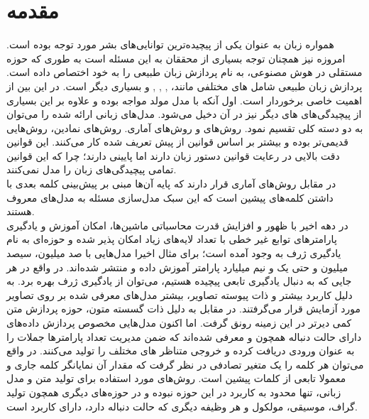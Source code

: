 \chapter{مقدمه}\label{Chap:Chap1}
\minitoc
همواره زبان به عنوان یکی از پیچیده‌ترین توانایی‌های بشر مورد توجه بوده است. امروزه نیز همچنان توجه بسیاری از محققان به این مسئله است به طوری که حوزه مستقلی در هوش مصنوعی، به نام پردازش زبان طبیعی را به خود اختصاص داده است. پردازش زبان طبیعی شامل 
های
مختلفی مانند، 
,
,
,
و بسیاری دیگر است. در این بین \task{}
از اهمیت خاصی برخوردار است. اول آنکه با مدل مولد مواجه بوده و علاوه بر این بسیاری از پیچیدگی‌های \task{}های دیگر نیز در آن دخیل می‌شود.
مدل‌های زبانی ارائه شده را می‌توان به دو دسته کلی تقسیم نمود. روش‌های
  و روش‌های آماری. روش‌های نمادین، روش‌هایی قدیمی‌تر بوده و بیشتر بر اساس قوانین از پیش تعریف شده کار می‌کنند. این قوانین دقت بالایی در رعایت قوانین دستور زبان دارند اما
   پایینی دارند؛ چرا که این قوانین تمامی پیچیدگی‌های زبان را مدل نمی‌کنند.\\
در مقابل روش‌های آماری قرار دارند که پایه آن‌ها مبنی بر پیش‌بینی کلمه بعدی با داشتن کلمه‌های پیشین است که این سبک مدل‌سازی مسئله به مدل‌های  معروف هستند. \\
در دهه اخیر با ظهور 
و افزایش قدرت محاسباتی ماشین‌ها، امکان آموزش و یادگیری پارامترهای توابع غیر خطی با تعداد لایه‌های زیاد امکان پذیر شده و حوزه‌ای به نام یادگیری ژرف به وجود آمده است؛ برای مثال اخیرا مدل‌هایی با صد میلیون، سیصد میلیون و حتی یک و نیم میلیارد پارامتر آموزش داده و منتشر شده‌اند. در واقع در هر جایی که به دنبال یادگیری تابعی پیچیده هستیم، می‌توان از یادگیری ژرف بهره برد. به دلیل کاربرد بیشتر و ذات پیوسته تصاویر، بیشتر مدل‌های معرفی شده بر روی تصاویر مورد آزمایش قرار می‌گرفتند. در مقابل به دلیل ذات گسسته متون، حوزه پردازش متن کمی دیرتر در این زمینه رونق گرفت. اما اکنون مدل‌هایی مخصوص پردازش داده‌های دارای حالت دنباله همچون \lstm{} و \transformer{} معرفی شده‌اند که ضمن مدیریت تعداد پارامتر‌ها جملات را به عنوان ورودی دریافت کرده و خروجی متناظر \task{}های مختلف را تولید می‌کنند. در واقع می‌توان هر کلمه را یک متغیر تصادفی در نظر گرفت که مقدار آن نمایانگر کلمه جاری و معمولا تابعی از کلمات پیشین است. روش‌های مورد استفاده برای تولید متن و مدل زبانی، تنها محدود به کاربرد در این حوزه نبوده و در حوزه‌های دیگری همچون تولید گراف، موسیقی، مولکول و هر وظیفه دیگری که حالت دنباله دارد، دارای کاربرد است.\\
